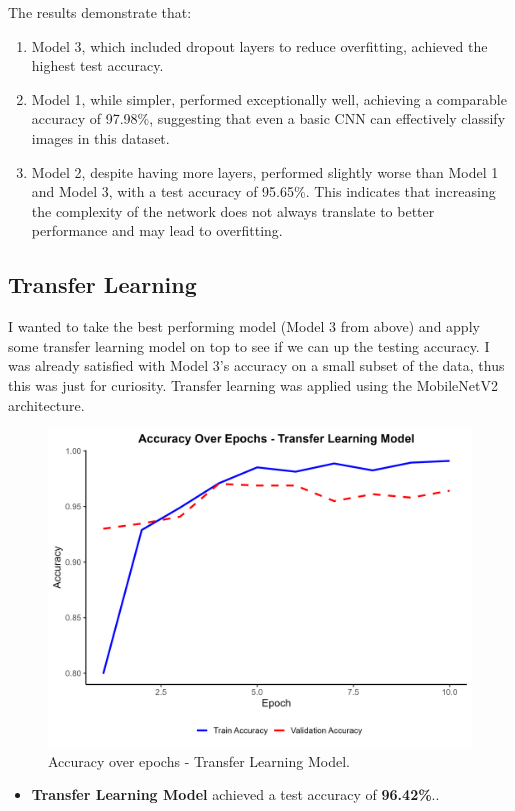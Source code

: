 \documentclass[a4paper,12pt]{article}
\begin{document}
The results demonstrate that:
\begin{enumerate}
    \item Model 3, which included dropout layers to reduce overfitting, achieved the highest test accuracy. 
    \item Model 1, while simpler, performed exceptionally well, achieving a comparable accuracy of 97.98\%, suggesting that even a basic CNN can effectively classify images in this dataset.
    \item Model 2, despite having more layers, performed slightly worse than Model 1 and Model 3, with a test accuracy of 95.65\%. This indicates that increasing the complexity of the network does not always translate to better performance and may lead to overfitting.
\end{enumerate}


\subsection{Transfer Learning}
 I wanted to take the best performing model (Model 3 from above) and apply some transfer learning model on top to see if we can up the testing accuracy. I was already satisfied with Model 3's accuracy on a small subset of the data, thus this was just for curiosity. Transfer learning was applied using the MobileNetV2 architecture.

\begin{figure}[H]
    \centering
    \includegraphics[width=0.8\linewidth]{results/accuracy_plot_transfer_model.png}
    \caption{Accuracy over epochs - Transfer Learning Model.}
\end{figure}

\begin{itemize}
    \item \textbf{Transfer Learning Model} achieved a test accuracy of \textbf{96.42\%}..
\end{itemize}
\end{document}
